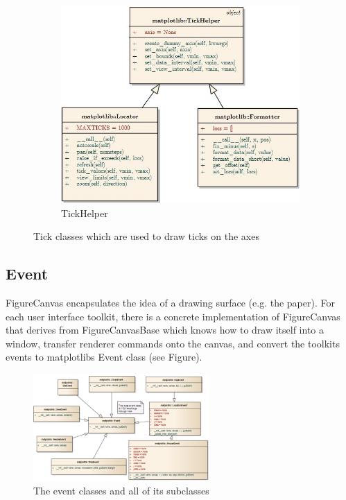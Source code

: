 \documentclass[pdftex,10pt,a4paper]{report}
\begin{document}
\begin{figure}[ht!]
\begin{subfigure}[b]{0.3\textwidth}
                \includegraphics[width=\textwidth]{img/umls/pi/tickhelper}
                \caption{TickHelper}
                \label{fig:pie}
        \end{subfigure}
        \caption{Tick classes which are used to draw ticks on the axes}\label{fig:examples}
\end{figure}



\subsection{Event}

FigureCanvas encapsulates the idea of a drawing surface (e.g. the paper). For each user interface toolkit, there is a concrete implementation of FigureCanvas that derives from FigureCanvasBase which knows how to draw itself into a window, transfer renderer commands onto the canvas, and convert the toolkits events to matplotlibs Event class (see Figure).

\begin{figure}[ht!]
        \centering
                \includegraphics[width=0.6\textwidth]{img/umls/nick/event}
        \caption{The event classes and all of its subclasses}\label{fig:artistExAgg}
\end{figure}
\end{document}

